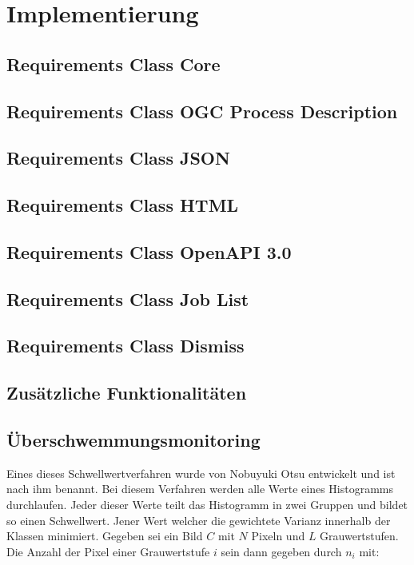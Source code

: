 \newpage
\restoregeometry
\section{Implementierung}
\subsection{Requirements Class Core}
\subsection{Requirements Class OGC Process Description}
\subsection{Requirements Class JSON}
\subsection{Requirements Class HTML}
\subsection{Requirements Class OpenAPI 3.0}
\subsection{Requirements Class Job List}
\subsection{Requirements Class Dismiss}
\subsection{Zusätzliche Funktionalitäten}
\subsection{Überschwemmungsmonitoring}
Eines dieses Schwellwertverfahren wurde von Nobuyuki Otsu entwickelt und ist nach ihm benannt. Bei diesem Verfahren werden alle Werte eines Histogramms durchlaufen.
Jeder dieser Werte teilt das Histogramm in zwei Gruppen und bildet so einen Schwellwert. Jener Wert welcher die gewichtete Varianz innerhalb der Klassen minimiert.
Gegeben sei ein Bild $C$ mit $N$ Pixeln und $L$ Grauwertstufen. Die Anzahl der Pixel einer Grauwertstufe $i$ sein dann gegeben durch $n_i$ mit:

